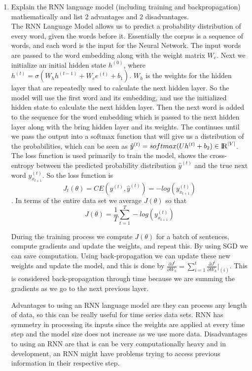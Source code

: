 \documentclass[12pt]{article}
\begin{document}
\begin{enumerate}
    \item Explain the RNN language model (including training and backpropagation) mathematically and list 2 advantages and 2 disadvantages.\\
    
The RNN Language Model allows us to predict a probability distribution of every word, given the words before it. Essentially the corpus is a sequence of words, and each word is the input for the Neural Network. The input words are passed to the word embedding along with the weight matrix $W_{e}$. Next we initialize an initial hidden state $h^{(0)}$, where $h^{(t)} = \sigma (W_{h} h^{(t-1)}+W_{e} e^{(t)} + b_{1})$. $W_{h} $ is the weights for the hidden layer that are repeatedly used to calculate the next hidden layer. So the model will use the first word and its embedding, and use the initialized hidden state to calculate the next hidden layer. Then the next word is added to the sequence for the word embedding which is passed to the next hidden layer along with the bring hidden layer and its weights. The continues until we pass the output into a softmax function that will give us a distribution of the probabilities, which can be seen as
$ \hat{y}^{(t)} = softmax(Uh^{(t)} + b_{2}) \in  {\rm I\!R}^{|V|}  $. The loss function is used primarily to train the model, shows the cross-entropy between the predicted probability distribution $\hat{y}^{(t)}$ and the true next word $y^{(t)}_{x_{t+1}}$. So the loss function is  $$J_{t}( \theta) = CE( y^{(t)} , \hat{y}^{(t)}) = -log(y^{(t)}_{x_{t+1}})$$. In terms of the entire data set we average $J(\theta)$ so that$$J(\theta) = \frac{1}{T}\sum_{t=1}^{T}-log(y^{(t)}_{x_{t+1}})$$

During the training process we compute $J(\theta)$ for a batch of sentences, compute gradients and update the weights, and repeat this. By using SGD we can save computation. Using back-propagation we can update these new weights and update the model, and this is done by $\frac{\partial J^{t}}{\partial W_{h}} = \sum_{i=1}^{t} \frac{\partial J^{t}}{\partial W_{h}} | _{(i)}$. This is considered back-propagation through time because we are summing the gradients as we go to the next previous layer. 

Advantages to using an RNN language model are they can process any length of data, so this can be really useful for time series data sets. RNN has symmetry in processing its inputs since the weights are applied at every time step and the model size does not increase as we use more data. Disadvantages to using an RNN are that is can be very computationally heavy and in development, an RNN might have problems trying to access previous information in their respective step.\\


\end{enumerate}
\end{document}
